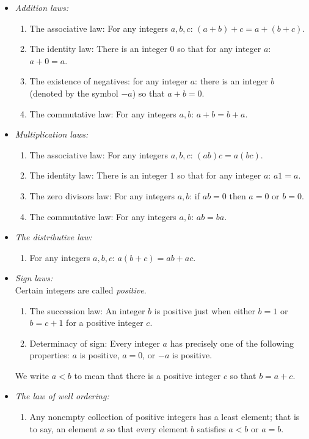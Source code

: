 \begin{itemize}
\item[]\emph{Addition laws:}
\begin{enumerate}
\item The associative law: For any integers \(a, b, c\): \((a+b)+c=a+(b+c)\).
\item The identity law: There is an integer \(0\) so that for any integer \(a\): \(a+0=a\).
\item The existence of negatives: for any integer \(a\): there is an integer \(b\) (denoted by the symbol \(-a\)) so that \(a+b=0\).
\item The commutative law: For any integers \(a, b\): \(a+b=b+a\).
\end{enumerate}
\smallskip
\item[]\emph{Multiplication laws:}
\begin{enumerate}
\item The associative law: For any integers \(a, b, c\): \((ab)c=a(bc)\).
\item The identity law: There is an integer \(1\) so that for any integer \(a\): \(a1=a\).
\item The zero divisors law: For any integers \(a,b\): if \(ab=0\) then \(a=0\) or \(b=0\).
\item The commutative law: For any integers \(a, b\): \(ab=ba\).
\end{enumerate}
\smallskip
\item[]\emph{The distributive law:}
\begin{enumerate}
\item For any integers \(a, b, c\): \(a(b+c)=ab+ac\).
\end{enumerate}
\smallskip
\item[]\emph{Sign laws:} \smallskip \\ 
Certain integers are called \emph{positive}.
\begin{enumerate}
\item The succession law: An integer \(b\) is positive just when either \(b=1\) or \(b=c+1\) for a positive integer \(c\).
\item Determinacy of sign: Every integer \(a\) has precisely one of the following properties: \(a\) is positive, \(a=0\), or \(-a\) is positive.
\end{enumerate}
We write \(a<b\) to mean that there is a positive integer \(c\) so that \(b=a+c\). 
\smallskip
\item[]\emph{The law of well ordering:}
\begin{enumerate}
\item
Any nonempty collection of positive integers has a least element; that is to say, an element \(a\) so that every element \(b\) satisfies \(a<b\) or \(a=b\).
\end{enumerate}
\end{itemize}

